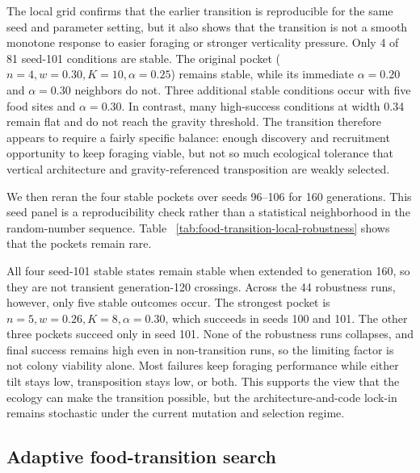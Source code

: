 \documentclass[11pt]{article}
\begin{document}


The local grid confirms that the earlier transition is reproducible for the
same seed and parameter setting, but it also shows that the transition is not a
smooth monotone response to easier foraging or stronger verticality pressure.
Only 4 of 81 seed-101 conditions are stable. The original pocket
($n=4,w=0.30,K=10,\alpha=0.25$) remains stable, while its immediate
$\alpha=0.20$ and $\alpha=0.30$ neighbors do not. Three additional stable
conditions occur with five food sites and $\alpha=0.30$. In contrast, many
high-success conditions at width 0.34 remain flat and do not reach the gravity
threshold. The transition therefore appears to require a fairly specific
balance: enough discovery and recruitment opportunity to keep foraging viable,
but not so much ecological tolerance that vertical architecture and
gravity-referenced transposition are weakly selected.

We then reran the four stable pockets over seeds 96--106 for 160 generations.
This seed panel is a reproducibility check rather than a statistical
neighborhood in the random-number sequence. Table~
\ref{tab:food-transition-local-robustness} shows that the pockets remain rare.



All four seed-101 stable states remain stable when extended to generation 160,
so they are not transient generation-120 crossings. Across the 44 robustness
runs, however, only five stable outcomes occur. The strongest pocket is
$n=5,w=0.26,K=8,\alpha=0.30$, which succeeds in seeds 100 and 101. The other
three pockets succeed only in seed 101. None of the robustness runs collapses,
and final success remains high even in non-transition runs, so the limiting
factor is not colony viability alone. Most failures keep foraging performance
while either tilt stays low, transposition stays low, or both. This supports
the view that the ecology can make the transition possible, but the
architecture-and-code lock-in remains stochastic under the current mutation
and selection regime.

\subsection{Adaptive food-transition search}
\end{document}
